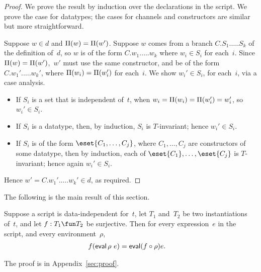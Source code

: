 
\begin{proof}
We prove the result by induction over the declarations in the script.  We
prove the case for datatypes; the cases for channels and constructors are
similar but more straightforward.

Suppose $w \in d$ and $\Pi(w) = \Pi(w')$.  Suppose $w$ comes from
a branch $C.S_1.\ldots.S_k$ of the definition of~$d$, so $w$ is of the form
$C.w_1.\ldots.w_k$ where $w_i \in S_i$ for each~$i$.  Since $\Pi(w) =
\Pi(w')$,\, $w'$ must use the same constructor, and be of the form
$C.w_1'.\ldots.w_k'$, where $\Pi(w_i) = \Pi(w_i')$ for each~$i$.
We show $w_i' \in S_i$, for each~$i$, via a case analysis.
%
\begin{itemize}
\item If $S_i$ is a set that is independent of~$t$, when $w_i = \Pi(w_i) =
  \Pi(w_i') = w_i'$, so $w_i' \in S_i$.

\item If $S_i$ is a datatype, then, by induction, $S_i$ is
  $T$-invariant; hence  $w_i' \in S_i$. 

\item If $S_i$ is of the form $\eset{C_1, \ldots, C_j}$, where $C_1, \ldots,
  C_j$ are constructors of some datatype, then by induction, each of
  $\eset{C_1}, \ldots, \eset{C_j}$ is $T$-invariant; hence again $w_i' \in
  S_i$.  
\end{itemize}
%
Hence $w' = C.w_1'.\ldots.w_k' \in d$, as required.
\end{proof}



The following is the main result of this section.
%
\begin{prop}
\label{prop:expressions}
Suppose a script is data-independent for~$t$, let $T_1$ and~$T_2$ be two
instantiations of~$t$, and let $f : T_1 \fun T_2$ be surjective.  Then for
every expression~$e$ in the script, and every environment~$\rho$,
\begin{eqnarray*}
f(\mathop{\sf eval} \rho ~ e) & = \mathop{\sf eval} (f \circ \rho) e .
\end{eqnarray*}
\end{prop}
%
The proof is in Appendix~\ref{sec:proof}.
